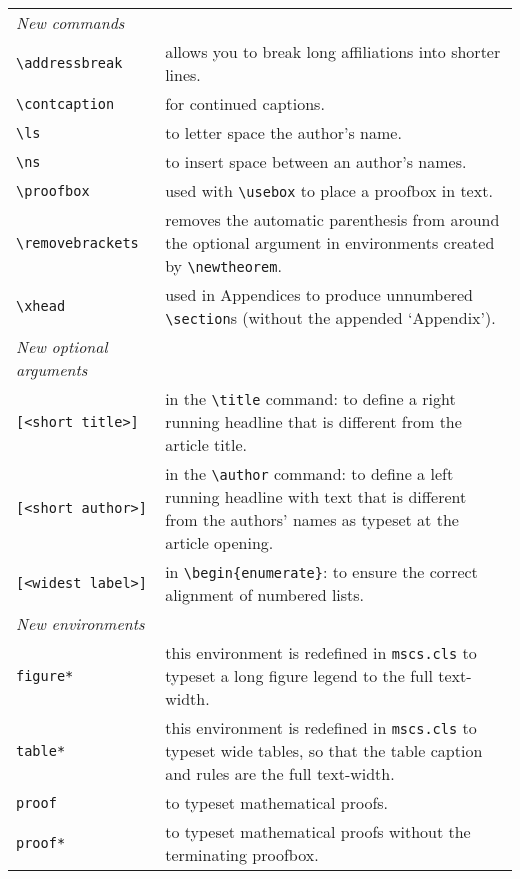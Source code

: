 \documentclass{mscs}
\begin{document}
\begin{tabular}{lp{8cm}}
\emph{New commands}     & \\
\verb"\addressbreak"    & allows you to break long affiliations into shorter lines.\\
\verb"\contcaption"     & for continued captions.\\
\verb"\ls"              & to letter space the author's name. \\
\verb"\ns"              & to insert space between an author's names. \\
\verb"\proofbox"        & used with \verb"\usebox" to place a proofbox
                          in text. \\
\verb"\removebrackets"  & removes the automatic parenthesis from around
                          the optional argument in environments created
                          by \verb"\newtheorem".\\
\verb"\xhead"           & used in Appendices to produce unnumbered
                          \verb"\section"s (without the appended `Appendix').\\[6.5pt]
\emph{New optional arguments} & \\
\verb"[<short title>]"  & in the \verb"\title" command: to define a right running
                          headline that is different from the article title. \\
\verb"[<short author>]" & in the \verb"\author" command: to define a left running
                          headline with text that is different from the
                          authors' names as typeset at the article opening. \\
\verb"[<widest label>]" & in \verb"\begin{enumerate}": to ensure the correct alignment
                          of numbered lists.\\[6.5pt]
\emph{New environments}  & \\
\verb"figure*"          & this environment is redefined in \verb"mscs.cls" to typeset
                          a long figure legend to the full text-width. \\
\verb"table*"           & this environment is redefined in \verb"mscs.cls" to typeset
                          wide tables, so that the table caption and rules are the
                          full text-width. \\
\verb"proof"            & to typeset mathematical proofs. \\
\verb"proof*"           & to typeset mathematical proofs without the
                          terminating proofbox.
\end{tabular}
\end{document}
